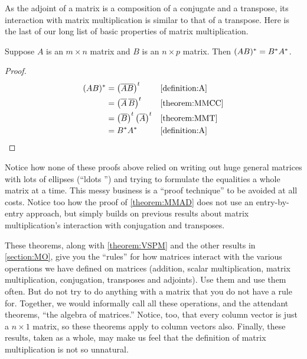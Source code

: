 \documentclass{ximera}
\begin{document}
As the adjoint of a matrix is a composition of a conjugate and a transpose, its interaction with matrix multiplication is similar to that of a transpose.  Here is the last of our long list of basic properties of matrix multiplication.

\begin{theorem}
\label{theorem:MMAD}

Suppose $A$ is an $m\times n$ matrix and $B$ is an $n\times p$ matrix.  Then $(AB)^\ast=B^\ast A^\ast$.

\begin{proof}

\begin{align*}
(AB)^\ast
&=\left(\overline{AB}\right)^{t}&&\ref{definition:A}\\
&=\left(\overline{A}\,\overline{B}\right)^{t}&&\ref{theorem:MMCC}\\
&=\left(\overline{B}\right)^{t}\left(\overline{A}\right)^{t}&&\ref{theorem:MMT}\\
&=B^\ast A^\ast&&\ref{definition:A}
\end{align*}

\end{proof}
\end{theorem}

Notice how none of these proofs above relied on writing out huge
general matrices with lots of ellipses (``ldots '') and trying to
formulate the equalities a whole matrix at a time.  This messy
business is a ``proof technique'' to be avoided at all costs.  Notice
too how the proof of \ref{theorem:MMAD} does not use an entry-by-entry
approach, but simply builds on previous results about matrix
multiplication's interaction with conjugation and transposes.

These theorems, along with \ref{theorem:VSPM} and the other results in
\ref{section:MO}, give you the ``rules'' for how matrices interact
with the various operations we have defined on matrices (addition,
scalar multiplication, matrix multiplication, conjugation, transposes
and adjoints).  Use them and use them often.  But do not try to do
anything with a matrix that you do not have a rule for.  Together, we
would informally call all these operations, and the attendant
theorems, ``the algebra of matrices.''  Notice, too, that every column
vector is just a $n\times 1$ matrix, so these theorems apply to column
vectors also.  Finally, these results, taken as a whole, may make us
feel that the definition of matrix multiplication is not so unnatural.
\end{document}

